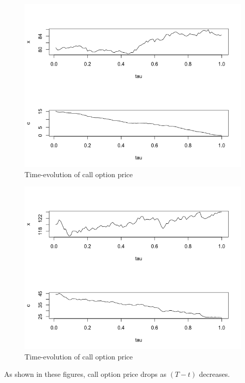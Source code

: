 \documentclass[12pt,a4paper]{paper}
\begin{document}
\begin{figure}[H]
\caption{Time-evolution of call option price}
\includegraphics[scale = 0.6]{figure2.png}
\end{figure}


\begin{figure}[H]
\caption{Time-evolution of call option price}
\includegraphics[scale = 0.6]{figure3.png}
\end{figure}

As shown in these figures, call option price drops as $(T-t)$ decreases.
\end{document}
